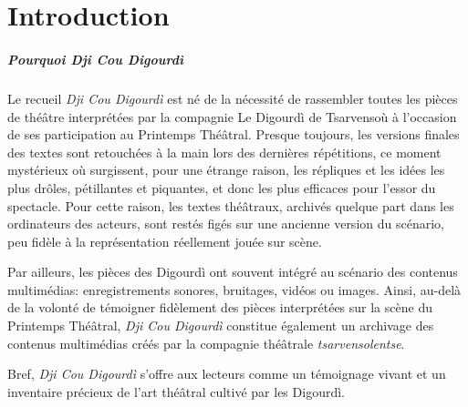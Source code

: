 \chapter*{Introduction} 




\paragraph*{Pourquoi \textit{Dji Cou Digourdì}}
Le recueil \textit{Dji Cou Digourdì} est né de la nécessité de rassembler toutes les pièces de théâtre interprétées par la compagnie Le Digourdì de Tsarvensoù à l'occasion de ses participation au Printemps Thé\^atral. Presque toujours, les versions finales des textes sont retouchées à la main lors des dernières répétitions, ce moment mystérieux où surgissent, pour une étrange raison, les répliques et les idées les plus drôles, pétillantes et piquantes, et donc les plus efficaces pour l’essor du spectacle. Pour cette raison, les textes théâtraux, archivés quelque part dans les ordinateurs des acteurs, sont restés figés sur une ancienne version du scénario, peu fidèle à la représentation réellement jouée sur scène.

Par ailleurs, les pièces des Digourdì ont souvent intégré au scénario des contenus multimédias: enregistrements sonores, bruitages, vidéos ou images. Ainsi, au-delà de la volonté de témoigner fidèlement des pièces interprétées sur la scène du Printemps Thé\^atral, \textit{Dji Cou Digourdì} constitue également un archivage des contenus multimédias créés par la compagnie théâtrale \textit{tsarvensolentse}.

Bref, \textit{Dji Cou Digourdì} s'offre aux lecteurs comme un témoignage vivant et un inventaire précieux de l'art théâtral cultivé par les Digourdì.

